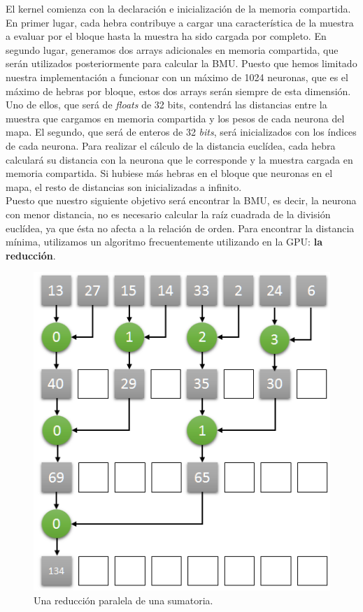 El kernel comienza con la declaración e inicialización de la memoria compartida.\\

En primer lugar, cada hebra contribuye a cargar una característica de la muestra a evaluar por el bloque hasta la muestra ha sido cargada por completo. En segundo lugar, generamos dos arrays adicionales en memoria compartida, que serán utilizados posteriormente para calcular la BMU. Puesto que hemos limitado nuestra implementación a funcionar con un máximo de 1024 neuronas, que es el máximo de hebras por bloque, estos dos arrays serán siempre de esta dimensión. Uno de ellos, que será de \textit{floats} de 32 bits, contendrá las distancias entre la muestra que cargamos en memoria compartida y los pesos de cada neurona del mapa. El segundo, que será de enteros de 32 \textit{bits}, será inicializados con los índices de cada neurona. Para realizar el cálculo de la distancia euclídea, cada hebra calculará su distancia con la neurona que le corresponde y la muestra cargada en memoria compartida. Si hubiese más hebras en el bloque que neuronas en el mapa, el resto de distancias son inicializadas a infinito. \\

Puesto que nuestro siguiente objetivo será encontrar la BMU, es decir, la neurona con menor distancia, no es necesario calcular la raíz cuadrada de la división euclídea, ya que ésta no afecta a la relación de orden. Para encontrar la distancia mínima, utilizamos un algoritmo frecuentemente utilizando en la GPU: \textbf{la reducción}.
\begin{figure}[ht]
\centering
\includegraphics[scale=0.5]{imagenes/parallel_reduce.png}
\caption{Una reducción paralela de una sumatoria.}
\label{image:cudareduction}
\end{figure}

